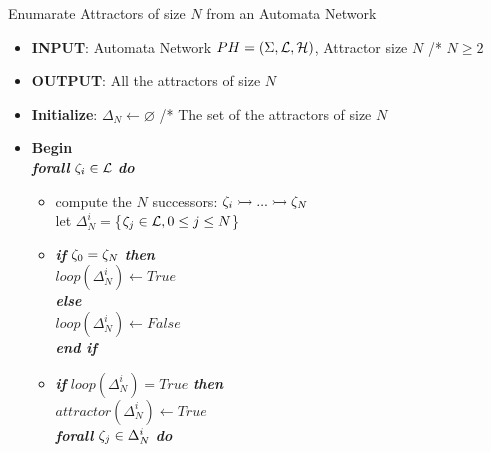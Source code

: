 \begin{algorithm}[!h]
	\caption{Enumarate Attractors of size $N$ from an Automata Network}
	\label{alg:PH-attractor}
	\begin{itemize}
		\item[] \textbf{INPUT}: Automata Network $PH=(\Sigma,\mathcal{L},\mathcal{H})$, Attractor size $N$ /* $N \geq 2$
		\item[] \textbf{OUTPUT}: All the attractors of size $N$
		\item[] \textbf{Initialize}: $\Delta_N \longleftarrow \varnothing$ /* The set of the attractors of size $N$
		\item[] \textbf{Begin} \\
		
			\hspace{0.2cm}	\textbf{\textit{forall}} $\zeta_i \in \mathcal{L}$ \textbf{\textit{do}} 
				
				\begin{itemize}
					\item[] compute the $N$ successors: $\zeta_i \rightarrowtail ... \rightarrowtail \zeta_N$ \\ let $\Delta_N^i=$\{$\zeta_j \in \mathcal{L}, 0 \leq j \leq N$\} %
					
					\item[] \textbf{\textit{if}} $\zeta_0 = \zeta_N$ \textbf{\textit{then}} \\
						\hspace{0.5cm}  $loop(\Delta_N^i) \longleftarrow True$ \\
					 \textbf{\textit{else}} \\
					 	\hspace{0.5cm}  $loop(\Delta_N^i) \longleftarrow False$ \\
					 \textbf{\textit{end if}} 
					 
					\item[] \textbf{\textit{if}} $loop(\Delta_N^i) = True$ \textbf{\textit{then}} \\
					
							\hspace{0.7cm} $attractor(\Delta_N^i) \longleftarrow True$	\\
							
							\hspace{0.7cm} \textbf{\textit{forall}} $\zeta_j \in \Delta_N^i$ \textbf{\textit{do}} \\
							

\end{itemize}
\end{itemize}
\end{algorithm}
